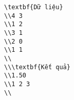 \begin{verbatim}
\textbf{Dữ liệu}
\\4 3
\\1 2
\\3 1
\\2 0
\\1 1
\\
\\\textbf{Kết quả}
\\1.50
\\1 2 3
\\\end{verbatim}